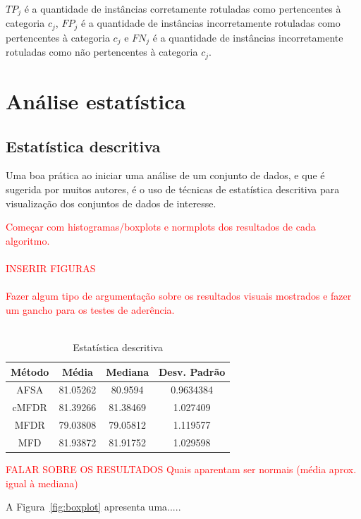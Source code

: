 \documentclass[conference]{IEEEtran}
\begin{document}
$TP_j$ é a quantidade de instâncias corretamente rotuladas como pertencentes à categoria $c_j$, $FP_j$ é a quantidade de instâncias incorretamente rotuladas como pertencentes à categoria $c_j$ e $FN_j$ é a quantidade de instâncias incorretamente rotuladas como não pertencentes à categoria $c_j$. 

\section{Análise estatística}
\label{sec:analise}

\subsection{Estatística descritiva}

Uma boa prática ao iniciar uma análise de um conjunto de dados, e que é sugerida por muitos autores, é o uso de técnicas de estatística descritiva para visualização dos conjuntos de dados de interesse\cite{montgomery2010applied}.

\textcolor{red} {Começar com histogramas/boxplots e normplots dos resultados de cada algoritmo. \\ \\
INSERIR FIGURAS \\ \\ 
Fazer algum tipo de argumentação sobre os resultados visuais mostrados e fazer um gancho para os testes de aderência.\\ \\}

\begin{table}[h]
	\centering
	\caption{Estatística descritiva}
	\label{tab:est_descr}
	\begin{tabular}{cccc}
		Método    & Média  & Mediana & Desv. Padrão  \\
		\hline
		AFSA&		81.05262 	& 80.9594 	& 0.9634384 \\
		cMFDR&      81.39266 	& 81.38469 	& 1.027409 \\
		MFDR& 		79.03808 	& 79.05812 	& 1.119577 \\
		MFD&     	81.93872 	& 81.91752 	& 1.029598 \\
		\hline
	\end{tabular}
\end{table}

\textcolor{red}{FALAR SOBRE OS RESULTADOS
Quais aparentam ser normais (média aprox. igual à mediana)
}


A Figura~\ref{fig:boxplot} apresenta uma.....
\end{document}
